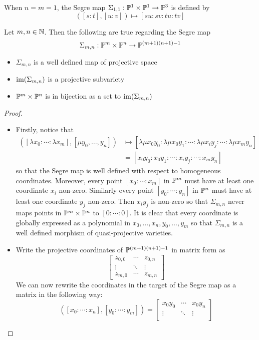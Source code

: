 \documentclass[a4paper]{article}
\begin{document}
When $n=m=1$, the Segre map $\Sigma_{1,1}:\mathbb{P}^1\times\mathbb{P}^1\to\mathbb{P}^3$ is defined by $$([s:t],[u:v])\mapsto[su:sv:tu:tv]$$

\begin{prp}{}{} Let $m,n\in\N$. Then the following are true regarding the Segre map $$\Sigma_{m,n}:\Prj^m\times\Prj^n\to\Prj^{(m+1)(n+1)-1}$$
\begin{itemize}
\item $\Sigma_{m,n}$ is a well defined map of projective space
\item $\im(\Sigma_{m,n})$ is a projective subvariety
\item $\Prj^m\times\Prj^n$ is in bijection as a set to $\im(\Sigma_{m,n})$
\end{itemize} \tcbline
\begin{proof}~\\
\begin{itemize}
\item Firstly, notice that 
\begin{align*}
([\lambda x_0:\cdots:\lambda x_m],[\mu y_0,\dots,y_n])&\mapsto[\lambda\mu x_0y_0:\lambda\mu x_0y_1:\cdots:\lambda\mu x_iy_j:\cdots:\lambda\mu x_my_n]\\
&=[x_0y_0:x_0y_1:\cdots:x_iy_j:\cdots:x_my_n]
\end{align*} so that the Segre map is well defined with respect to homogeneous coordinates. Moreover, every point $[x_0:\cdots:x_m]$ in $\Prj^m$ must have at least one coordinate $x_i$ non-zero. Similarly every point $[y_0:\cdots:y_n]$ in $\Prj^n$ must have at least one coordinate $y_j$ non-zero. Then $x_iy_j$ is non-zero so that $\Sigma_{m,n}$ never maps points in $\Prj^m\times\Prj^n$ to $[0:\cdots:0]$. It is clear that every coordinate is globally expressed as a polynomial in $x_0,\dots,x_n,y_0,\dots,y_m$ so that $\Sigma_{m,n}$ is a well defined morphism of quasi-projective varieties. 
\item Write the projective coordinates of $\Prj^{(m+1)(n+1)-1}$ in matrix form as $$\begin{bmatrix}
z_{0,0} & \cdots & z_{0,n}\\
\vdots & \ddots & \vdots\\
z_{m,0} & \cdots & z_{m,n}
\end{bmatrix}$$
We can now rewrite the coordinates in the target of the Segre map as a matrix in the following way: $$([x_0:\cdots:x_n],[y_0:\cdots:y_m])=\begin{bmatrix}
x_0y_0 & \cdots & x_0y_n\\
\vdots & \ddots & \vdots\\

\end{bmatrix}$$
\end{itemize}
\end{proof}
\end{prp}
\end{document}
